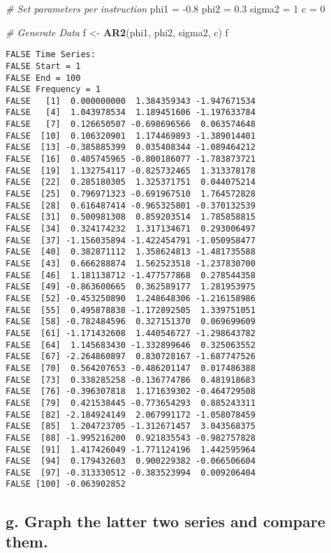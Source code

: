 \documentclass[openany]{book}
\newenvironment{Shaded}{\begin{snugshade}}{\end{snugshade}}
\newcommand{\CommentTok}[1]{\textcolor[rgb]{0.56,0.35,0.01}{\textit{#1}}}
\newcommand{\DecValTok}[1]{\textcolor[rgb]{0.00,0.00,0.81}{#1}}
\newcommand{\FloatTok}[1]{\textcolor[rgb]{0.00,0.00,0.81}{#1}}
\newcommand{\KeywordTok}[1]{\textcolor[rgb]{0.13,0.29,0.53}{\textbf{#1}}}
\newcommand{\NormalTok}[1]{#1}
\newcommand{\StringTok}[1]{\textcolor[rgb]{0.31,0.60,0.02}{#1}}
\begin{document}
\begin{Shaded}
\begin{Highlighting}[]
\CommentTok{# Set parameters per instruction}
\NormalTok{phi1 =}\StringTok{ }\FloatTok{-0.8}
\NormalTok{phi2 =}\StringTok{ }\FloatTok{0.3}
\NormalTok{sigma2 =}\StringTok{ }\DecValTok{1}
\NormalTok{c =}\StringTok{ }\DecValTok{0}

\CommentTok{# Generate Data}
\NormalTok{f <-}\StringTok{ }\KeywordTok{AR2}\NormalTok{(phi1, phi2, sigma2, c)}
\NormalTok{f}
\end{Highlighting}
\end{Shaded}

\begin{verbatim}
FALSE Time Series:
FALSE Start = 1 
FALSE End = 100 
FALSE Frequency = 1 
FALSE   [1]  0.000000000  1.384359343 -1.947671534
FALSE   [4]  1.043978534  1.189451606 -1.197633784
FALSE   [7]  0.126650507 -0.698696566  0.063574648
FALSE  [10]  0.106320901  1.174469893 -1.389014401
FALSE  [13] -0.385885399  0.035408344 -1.089464212
FALSE  [16]  0.405745965 -0.800186077 -1.783873721
FALSE  [19]  1.132754117 -0.825732465  1.313378178
FALSE  [22]  0.285180305  1.325371751  0.044075214
FALSE  [25]  0.796971323 -0.691967510  1.764572828
FALSE  [28]  0.616487414 -0.965325801 -0.370132539
FALSE  [31]  0.500981308  0.859203514  1.785858815
FALSE  [34]  0.324174232  1.317134671  0.293006497
FALSE  [37] -1.156035894 -1.422454791 -1.050958477
FALSE  [40]  0.382871112  1.358624813 -1.481735588
FALSE  [43]  0.666288874  1.562523518 -1.237830700
FALSE  [46]  1.181138712 -1.477577868  0.278544358
FALSE  [49] -0.863600665  0.362589177  1.281953975
FALSE  [52] -0.453250890  1.248648306 -1.216158986
FALSE  [55]  0.495878838 -1.172892505  1.339751051
FALSE  [58] -0.782484596  0.327151370  0.069699609
FALSE  [61] -1.171432608  1.440546727 -1.298643782
FALSE  [64]  1.145683430 -1.332899646  0.325063552
FALSE  [67] -2.264860897  0.830728167 -1.687747526
FALSE  [70]  0.564207653 -0.486201147  0.017486388
FALSE  [73]  0.338285258 -0.136774786  0.481918683
FALSE  [76] -0.396307818  1.171639302 -0.464729508
FALSE  [79]  0.421538445 -0.773654293  0.885243311
FALSE  [82] -2.184924149  2.067991172 -1.058078459
FALSE  [85]  1.204723705 -1.312671457  3.043568375
FALSE  [88] -1.995216200  0.921835543 -0.982757828
FALSE  [91]  1.417426049 -1.771124196  1.442595964
FALSE  [94]  0.179432603  0.900229382 -0.066506604
FALSE  [97] -0.313330512 -0.383523994  0.009206404
FALSE [100] -0.063902852
\end{verbatim}

\hypertarget{g.-graph-the-latter-two-series-and-compare-them.}{%
\subsection{g. Graph the latter two series and compare them.}\label{g.-graph-the-latter-two-series-and-compare-them.}}
\end{document}
